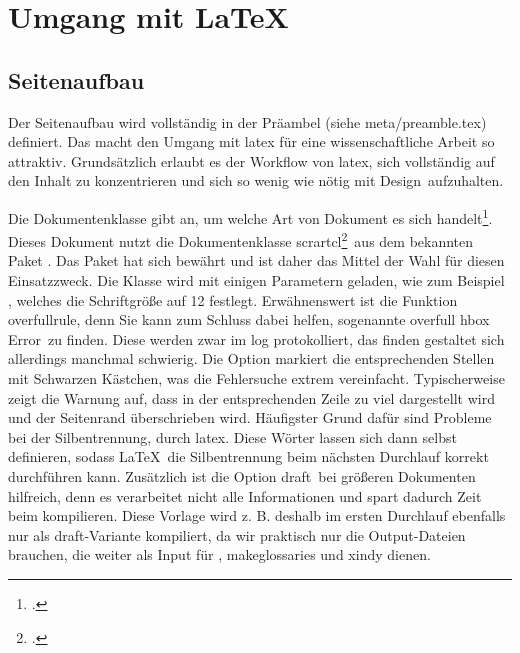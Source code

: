 
\newpage

\section{Umgang mit \protect\LaTeX{}}%
\label{sec:umgang}
\subsection{Seitenaufbau}%
\label{sec:seit-aufbau}
Der Seitenaufbau wird vollständig in der Präambel (siehe meta/preamble.tex) definiert. Das macht den Umgang mit \gls{latex} für eine wissenschaftliche Arbeit so attraktiv. Grundsätzlich erlaubt es der Workflow von \gls{latex}, sich vollständig auf den Inhalt zu konzentrieren und sich so wenig wie nötig mit \glqq Design\grqq\ aufzuhalten.

Die Dokumentenklasse gibt an, um welche Art von Dokument es sich handelt\footcite[Vgl. ][S. 9]{oetiker_not_2018}. Dieses Dokument nutzt die Dokumentenklasse \glqq scrartcl\grqq\footcite[S. 51]{kohm_koma_2019}\ aus dem bekannten Paket . Das Paket hat sich bewährt und ist daher das Mittel der Wahl für diesen Einsatzzweck.
Die Klasse wird mit einigen Parametern geladen, wie zum Beispiel \glqq 12pt\grqq, welches die Schriftgröße auf 12 festlegt. Erwähnenswert ist die Funktion \glqq overfullrule\grqq, denn Sie kann zum Schluss dabei helfen, sogenannte \glqq overfull hbox Error\grqq\ zu finden. Diese werden zwar im log protokolliert, das finden gestaltet sich allerdings manchmal schwierig. Die Option markiert die entsprechenden Stellen mit Schwarzen Kästchen, was die Fehlersuche extrem vereinfacht. Typischerweise zeigt die Warnung auf, dass
in der entsprechenden Zeile zu viel dargestellt wird und der Seitenrand überschrieben wird. Häufigster Grund dafür sind Probleme bei der Silbentrennung, durch \gls{latex}. Diese Wörter lassen sich dann selbst definieren, sodass \LaTeX{}\ die Silbentrennung beim nächsten Durchlauf korrekt durchführen kann.
Zusätzlich ist die Option \glqq draft\grqq\ bei größeren Dokumenten hilfreich, denn es verarbeitet nicht alle Informationen und spart dadurch Zeit beim kompilieren. Diese Vorlage wird z. B. deshalb im ersten Durchlauf ebenfalls nur als \glqq draft\grqq-Variante kompiliert, da wir praktisch nur die Output-Dateien brauchen, die weiter als Input für , makeglossaries und xindy dienen.


